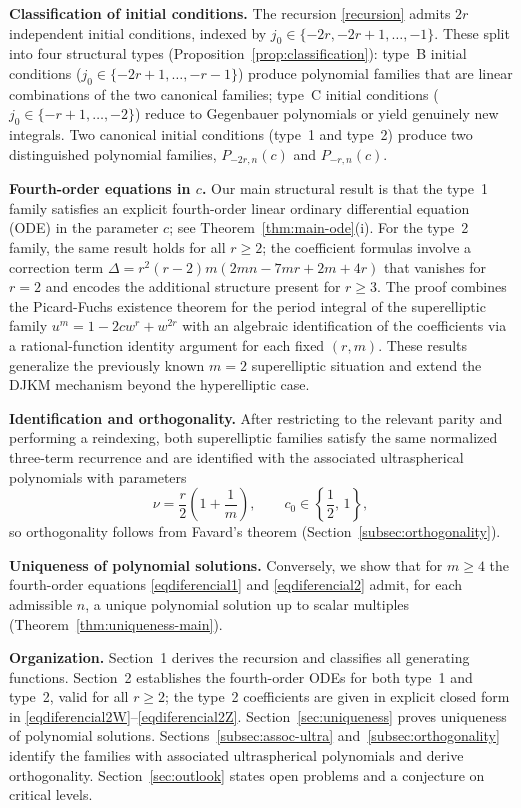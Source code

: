 \documentclass[final,nopreprintline]{elsarticle}
\theoremstyle{definition}
\numberwithin{equation}{section}
\theoremstyle{remark}
\begin{document}
\medskip
\noindent\textbf{Classification of initial conditions.}
The recursion \eqref{recursion} admits $2r$ independent initial conditions, indexed by
$j_0\in\{-2r,-2r+1,\ldots,-1\}$.  These split into four structural types
(Proposition~\ref{prop:classification}):
type~B initial conditions ($j_0\in\{-2r+1,\ldots,-r-1\}$) produce polynomial families
that are linear combinations of the two canonical families; type~C initial conditions
($j_0\in\{-r+1,\ldots,-2\}$) reduce to Gegenbauer polynomials or yield genuinely new
integrals. Two canonical initial conditions (type~1 and type~2) produce two distinguished
polynomial families, $P_{-2r,n}(c)$ and $P_{-r,n}(c)$.

\medskip
\noindent\textbf{Fourth-order equations in $c$.}
Our main structural result is that the type~1 family satisfies an explicit fourth-order
linear ordinary differential equation (ODE) in the parameter $c$; see Theorem~\ref{thm:main-ode}(i).
For the type~2 family, the same result holds for all $r\ge2$;
the coefficient formulas involve a correction term $\Delta=r^2(r-2)m(2mn-7mr+2m+4r)$
that vanishes for $r=2$ and encodes the additional structure present for $r\ge3$.
The proof combines the Picard-Fuchs existence theorem for the period integral of
the superelliptic family $u^m=1-2cw^r+w^{2r}$ with an algebraic identification
of the coefficients via a rational-function identity argument for each fixed $(r,m)$.
These results generalize the previously known $m=2$ superelliptic situation and extend the
DJKM mechanism beyond the hyperelliptic case.

\medskip
\noindent\textbf{Identification and orthogonality.}
After restricting to the relevant parity and performing a reindexing, both
superelliptic families satisfy the same normalized three-term recurrence and are
identified with the associated ultraspherical polynomials with parameters
\[
\nu=\frac r2\left(1+\frac1m\right),\qquad c_0\in\left\{\frac12,\,1\right\},
\]
so orthogonality follows from Favard's theorem (Section~\ref{subsec:orthogonality}).

\medskip
\noindent\textbf{Uniqueness of polynomial solutions.}
Conversely, we show that for $m\ge4$ the fourth-order equations
\eqref{eqdiferencial1} and \eqref{eqdiferencial2} admit, for each admissible $n$, a
unique polynomial solution up to scalar multiples
(Theorem~\ref{thm:uniqueness-main}).

\medskip
\noindent\textbf{Organization.}
Section~1 derives the recursion and classifies all generating functions.
Section~2 establishes the fourth-order ODEs for both type~1 and type~2, valid for all
$r\ge2$; the type~2 coefficients are given in explicit closed form in
\eqref{eqdiferencial2W}--\eqref{eqdiferencial2Z}.
Section~\ref{sec:uniqueness} proves uniqueness of polynomial solutions.
Sections~\ref{subsec:assoc-ultra} and~\ref{subsec:orthogonality} identify the
families with associated ultraspherical polynomials and derive orthogonality.
Section~\ref{sec:outlook} states open problems and a conjecture on critical levels.
\end{document}
